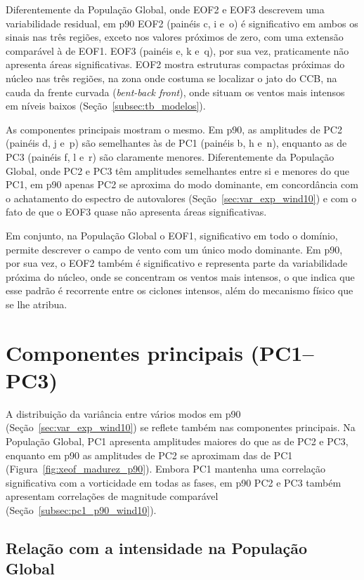Diferentemente da População Global, onde EOF2 e EOF3 descrevem uma variabilidade residual, em p90 EOF2 (painéis c, i e~o) é significativo em ambos os sinais nas três regiões, exceto nos valores próximos de zero, com uma extensão comparável à de EOF1. EOF3 (painéis e, k e~q), por sua vez, praticamente não apresenta áreas significativas. EOF2 mostra estruturas compactas próximas do núcleo nas três regiões, na zona onde costuma se localizar o jato do CCB, na cauda da frente curvada (\textit{bent-back front}), onde \citet{schemm2014linkage} situam os ventos mais intensos em níveis baixos (Seção~\ref{subsec:tb_modelos}).

As componentes principais mostram o mesmo. Em p90, as amplitudes de PC2 (painéis d, j e~p) são semelhantes às de PC1 (painéis b, h e~n), enquanto as de PC3 (painéis f, l e~r) são claramente menores. Diferentemente da População Global, onde PC2 e PC3 têm amplitudes semelhantes entre si e menores do que PC1, em p90 apenas PC2 se aproxima do modo dominante, em concordância com o achatamento do espectro de autovalores (Seção~\ref{sec:var_exp_wind10}) e com o fato de que o EOF3 quase não apresenta áreas significativas.

Em conjunto, na População Global o EOF1, significativo em todo o domínio, permite descrever o campo de vento com um único modo dominante. Em p90, por sua vez, o EOF2 também é significativo e representa parte da variabilidade próxima do núcleo, onde se concentram os ventos mais intensos, o que indica que esse padrão é recorrente entre os ciclones intensos, além do mecanismo físico que se lhe atribua.

\section{Componentes principais (PC1--PC3)}\label{subsec:res_dinamica_pc1}

A distribuição da variância entre vários modos em p90 (Seção~\ref{sec:var_exp_wind10}) se reflete também nas componentes principais. Na População Global, PC1 apresenta amplitudes maiores do que as de PC2 e PC3, enquanto em p90 as amplitudes de PC2 se aproximam das de PC1 (Figura~\ref{fig:xeof_madurez_p90}). Embora PC1 mantenha uma correlação significativa com a vorticidade em todas as fases, em p90 PC2 e PC3 também apresentam correlações de magnitude comparável (Seção~\ref{subsec:pc1_p90_wind10}).



\subsection{Relação com a intensidade na População Global}\label{subsec:pc1_global_wind10}

